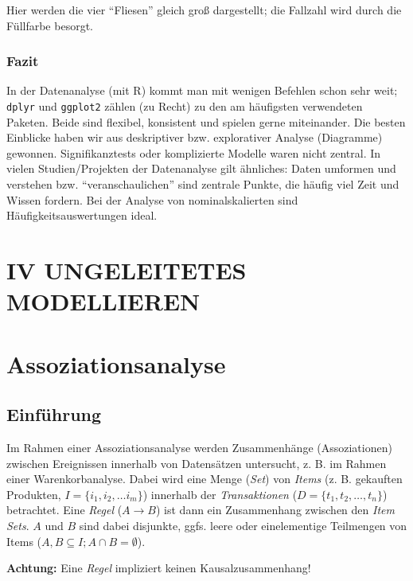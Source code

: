 \documentclass[12pt,]{book}
\begin{document}
Hier werden die vier ``Fliesen'' gleich groß dargestellt; die Fallzahl
wird durch die Füllfarbe besorgt.

\subsection{Fazit}\label{fazit}

In der Datenanalyse (mit R) kommt man mit wenigen Befehlen schon sehr
weit; \texttt{dplyr} und \texttt{ggplot2} zählen (zu Recht) zu den am
häufigsten verwendeten Paketen. Beide sind flexibel, konsistent und
spielen gerne miteinander. Die besten Einblicke haben wir aus
deskriptiver bzw. explorativer Analyse (Diagramme) gewonnen.
Signifikanztests oder komplizierte Modelle waren nicht zentral. In
vielen Studien/Projekten der Datenanalyse gilt ähnliches: Daten umformen
und verstehen bzw. ``veranschaulichen'' sind zentrale Punkte, die häufig
viel Zeit und Wissen fordern. Bei der Analyse von nominalskalierten sind
Häufigkeitsauswertungen ideal.

\chapter*{IV UNGELEITETES
MODELLIEREN}\label{iv-ungeleitetes-modellieren}

\chapter{Assoziationsanalyse}\label{assoziationsanalyse}

\section{Einführung}\label{einfuhrung}

Im Rahmen einer Assoziationsanalyse werden Zusammenhänge (Assoziationen)
zwischen Ereignissen innerhalb von Datensätzen untersucht, z. B. im
Rahmen einer Warenkorbanalyse. Dabei wird eine Menge (\emph{Set}) von
\emph{Items} (z. B. gekauften Produkten,
\(I=\{i_1, i_2, \ldots i_m \}\)) innerhalb der \emph{Transaktionen}
(\(D=\{t_1, t_2 ,\ldots ,t_n\}\)) betrachtet. Eine \emph{Regel}
(\(A \rightarrow B\)) ist dann ein Zusammenhang zwischen den \emph{Item
Sets}. \(A\) und \(B\) sind dabei disjunkte, ggfs. leere oder
einelementige Teilmengen von Items
(\(A, B \subseteq I; A\cap B=\emptyset\)).

\textbf{Achtung:} Eine \emph{Regel} impliziert keinen
Kausalzusammenhang!
\end{document}
